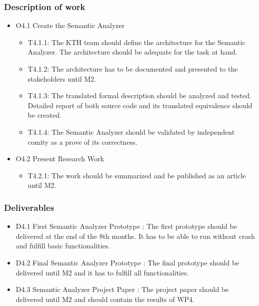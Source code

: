 \subsubsection{Description of work}
	\begin{itemize}
		\item O4.1 Create the Semantic Analyzer
		\begin{itemize}
			\item T4.1.1: The \gls{KTH} team should define the architecture for the Semantic Analyzer. The architecture should be adequate for the task at hand.
			\item T4.1.2: The architecture has to be documented and presented to the stakeholders until M2.
			\item T4.1.3: The translated formal description should be analyzed and tested. Detailed report of both source code and its translated equivalence should be created. 
			\item T4.1.4: The Semantic Analyzer should be validated by independent comity as a prove of its correctness.
		\end{itemize}
	
		\item O4.2 Present Research Work
		\begin{itemize}
			\item T4.2.1: The work should be summarized and be published as an article until M2. 
		\end{itemize}
	\end{itemize}
\subsubsection{Deliverables}
	\begin{itemize}
		\item D4.1 First Semantic Analyzer Prototype : The first prototype should be delivered at the end of the 8th months. It has to be able to run without crash and fulfill basic functionalities.
		\item D4.2 Final Semantic Analyzer Prototype : The final prototype should be delivered until M2 and it has to fulfill all functionalities.
		\item D4.3 Semantic Analyzer Project Paper : The project paper should be delivered until M2 and should contain the results of WP4.
	\end{itemize}